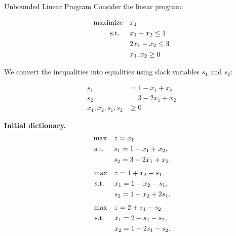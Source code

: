 \begin{example}{Unbounded Linear Program}\label{exa:simplex-unbounded}{}
\label{example:simplex-unbounded}
Consider the linear program:

\[
\begin{aligned}
\text{maximize} \quad & x_1 \\
\text{ s.t. } \quad
& x_1 - x_2 \leq 1 \\
& 2x_1 - x_2 \leq 3 \\
& x_1, x_2 \geq 0
\end{aligned}
\]

\begin{center}
\par{}\label{fig:unbounded-desmos-simplex}%

\end{center}
We convert the inequalities into equalities using slack variables \( s_1 \) and \( s_2 \):

\[
\begin{aligned}
s_1 &= 1 - x_1 + x_2 \\
s_2 &= 3 - 2x_1 + x_2 \\
x_1, x_2, s_1, s_2 &\geq 0
\end{aligned}
\]

\noindent\textbf{Initial dictionary.}
\[
\begin{aligned}
\max\quad & z = x_1 \\
\text{ s.t. }\quad & s_1 = 1 - x_1 + x_2,\\
& s_2 = 3 - 2x_1 + x_2.
\end{aligned}
\]
\[
\begin{aligned}
\max\quad & z = 1 + x_2 - s_1 \\
\text{ s.t. }\quad & x_1 = 1 + x_2 - s_1,\\
& s_2 = 1 - x_2 + 2s_1.
\end{aligned}
\]
\[
\begin{aligned}
\max\quad & z = 2 + s_1 - s_2 \\
\text{ s.t. }\quad & x_1 = 2 + s_1 - s_2,\\
& x_2 = 1 + 2s_1 - s_2.
\end{aligned}
\]


\end{example}

